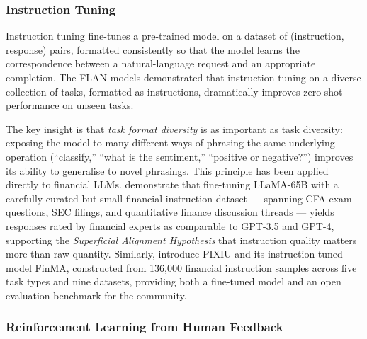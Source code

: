 \begin{deepdive}
\subsubsection*{Instruction Tuning}

Instruction tuning \cite{wei2022finetuned} fine-tunes a pre-trained model on
a dataset of (instruction, response) pairs, formatted consistently so that the
model learns the correspondence between a natural-language request and an
appropriate completion.  The FLAN models demonstrated that instruction tuning
on a diverse collection of tasks, formatted as instructions, dramatically
improves zero-shot performance on unseen tasks.

The key insight is that \emph{task format diversity} is as important as task
diversity: exposing the model to many different ways of phrasing the same
underlying operation (``classify,'' ``what is the sentiment,''
``positive or negative?'') improves its ability to generalise to novel phrasings.
This principle has been applied directly to financial LLMs.
\citet{yang2023investlm} demonstrate that fine-tuning LLaMA-65B with a carefully
curated but small financial instruction dataset --- spanning CFA exam questions,
SEC filings, and quantitative finance discussion threads --- yields responses
rated by financial experts as comparable to GPT-3.5 and GPT-4, supporting
the \emph{Superficial Alignment Hypothesis} that instruction quality matters
more than raw quantity.  Similarly, \citet{xie2023pixiu} introduce PIXIU and
its instruction-tuned model FinMA, constructed from 136{,}000 financial
instruction samples across five task types and nine datasets, providing both
a fine-tuned model and an open evaluation benchmark for the community.

\subsubsection*{Reinforcement Learning from Human Feedback}


\end{deepdive}
